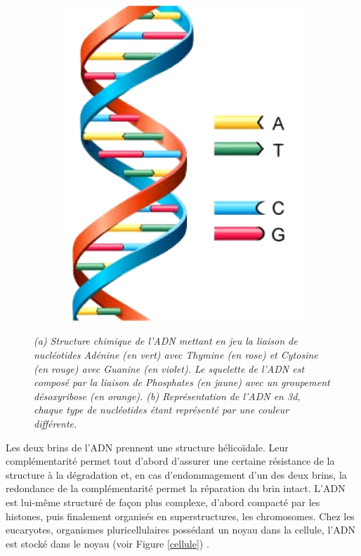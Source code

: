 \begin{figure}
\begin{subfigure}{.4\textwidth}
  {\includegraphics[width=0.75\linewidth]{./figures/ch1/dna_structure_3d}}
    \caption{}
    \label{Fig:dna_structure_3d}
  \end{subfigure}
  \caption{\it (a) Structure chimique de l'ADN mettant en jeu la liaison de nucléotides Adénine (en vert) avec Thymine (en rose) et Cytosine (en rouge) avec Guanine (en violet). Le squelette de l'ADN est composé par la liaison de Phosphates (en jaune) avec un groupement désoxyribose (en orange).
  (b) Représentation de l'ADN en 3d, chaque type de nucléotides étant représenté par une couleur différente.}
\end{figure}

Les deux brins de l'ADN prennent une structure hélicoïdale. Leur complémentarité permet tout d'abord d'assurer une certaine résistance de la structure à la dégradation et, en cas d'endommagement d'un des deux brins, la redondance de la complémentarité permet la réparation du brin intact.
L'ADN est lui-même structuré de façon plus complexe, d'abord compacté par les histones, puis finalement organisés en superstructures, les chromosomes. 
Chez les eucaryotes, organismes pluricellulaires possédant un noyau dans la cellule, l'ADN est stocké dans le noyau (voir Figure \ref{cellule}) \cite{johnson2011biologie}. 

